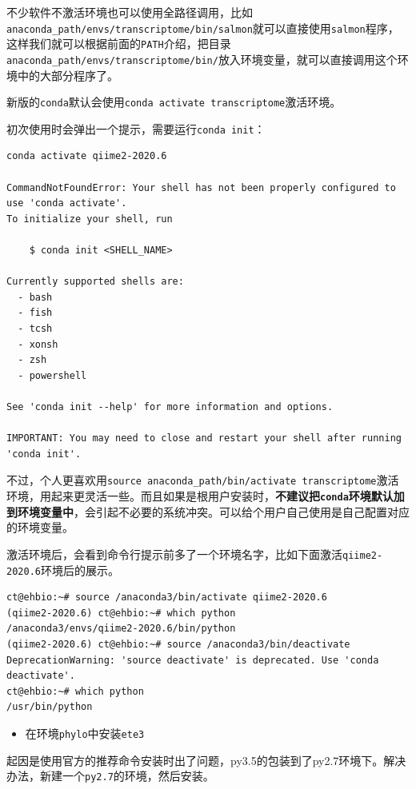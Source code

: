 \documentclass[]{article}
\providecommand{\tightlist}{%
  \setlength{\itemsep}{0pt}\setlength{\parskip}{0pt}}
\numberwithin{figure}{section}
\numberwithin{table}{section}
\begin{document}
不少软件不激活环境也可以使用全路径调用，比如\texttt{anaconda\_path/envs/transcriptome/bin/salmon}就可以直接使用\texttt{salmon}程序，这样我们就可以根据前面的\texttt{PATH}介绍，把目录\texttt{anaconda\_path/envs/transcriptome/bin/}放入环境变量，就可以直接调用这个环境中的大部分程序了。

新版的\texttt{conda}默认会使用\texttt{conda\ activate\ transcriptome}激活环境。

初次使用时会弹出一个提示，需要运行\texttt{conda\ init}：

\begin{verbatim}
conda activate qiime2-2020.6

CommandNotFoundError: Your shell has not been properly configured to use 'conda activate'.
To initialize your shell, run

    $ conda init <SHELL_NAME>

Currently supported shells are:
  - bash
  - fish
  - tcsh
  - xonsh
  - zsh
  - powershell

See 'conda init --help' for more information and options.

IMPORTANT: You may need to close and restart your shell after running 'conda init'.
\end{verbatim}

不过，个人更喜欢用\texttt{source\ anaconda\_path/bin/activate\ transcriptome}激活环境，用起来更灵活一些。而且如果是根用户安装时，\textbf{不建议把\texttt{conda}环境默认加到环境变量中}，会引起不必要的系统冲突。可以给个用户自己使用是自己配置对应的环境变量。

激活环境后，会看到命令行提示前多了一个环境名字，比如下面激活\texttt{qiime2-2020.6}环境后的展示。

\begin{verbatim}
ct@ehbio:~# source /anaconda3/bin/activate qiime2-2020.6
(qiime2-2020.6) ct@ehbio:~# which python
/anaconda3/envs/qiime2-2020.6/bin/python
(qiime2-2020.6) ct@ehbio:~# source /anaconda3/bin/deactivate
DeprecationWarning: 'source deactivate' is deprecated. Use 'conda deactivate'.
ct@ehbio:~# which python
/usr/bin/python
\end{verbatim}

\begin{itemize}
\tightlist
\item
  在环境\texttt{phylo}中安装\texttt{ete3}
\end{itemize}

起因是使用官方的推荐命令安装时出了问题，py3.5的包装到了py2.7环境下。解决办法，新建一个\texttt{py2.7}的环境，然后安装。
\end{document}
